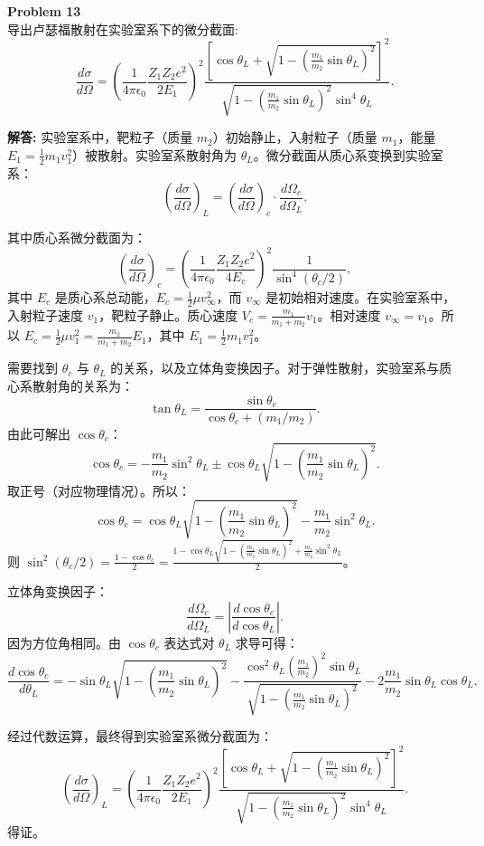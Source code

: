 \documentclass[12pt, a4paper, oneside]{ctexart}
\newenvironment{solution}{\par\noindent\textbf{解答:}\quad}{\par}
\begin{document}
\begin{mdframed}[backgroundcolor=gray!10, linewidth=0pt]
    \textbf{Problem 13} \\
    导出卢瑟福散射在实验室系下的微分截面:
    \[
    \frac{d\sigma}{d\Omega} = \left( \frac{1}{4\pi\epsilon_0} \frac{Z_1 Z_2 e^2}{2 E_1} \right)^2 \frac{\left[ \cos\theta_L + \sqrt{1 - \left( \frac{m_1}{m_2} \sin\theta_L \right)^2 } \right]^2 }{ \sqrt{1 - \left( \frac{m_1}{m_2} \sin\theta_L \right)^2 } \sin^4\theta_L }.
    \]
\end{mdframed}
\begin{solution}
    实验室系中，靶粒子（质量 \(m_2\)）初始静止，入射粒子（质量 \(m_1\)，能量 \(E_1 = \frac{1}{2} m_1 v_1^2\)）被散射。实验室系散射角为 \(\theta_L\)。微分截面从质心系变换到实验室系：
    \[
    \left( \frac{d\sigma}{d\Omega} \right)_L = \left( \frac{d\sigma}{d\Omega} \right)_c \cdot \frac{d\Omega_c}{d\Omega_L}.
    \]
    
    其中质心系微分截面为：
    \[
    \left( \frac{d\sigma}{d\Omega} \right)_c = \left( \frac{1}{4\pi\epsilon_0} \frac{Z_1 Z_2 e^2}{4 E_c} \right)^2 \frac{1}{\sin^4(\theta_c/2)},
    \]
    其中 \(E_c\) 是质心系总动能，\(E_c = \frac{1}{2} \mu v_\infty^2\)，而 \(v_\infty\) 是初始相对速度。在实验室系中，入射粒子速度 \(v_1\)，靶粒子静止。质心速度 \(V_c = \frac{m_1}{m_1+m_2} v_1\)。相对速度 \(v_\infty = v_1\)。所以 \(E_c = \frac{1}{2} \mu v_1^2 = \frac{m_2}{m_1+m_2} E_1\)，其中 \(E_1 = \frac{1}{2} m_1 v_1^2\)。
    
    需要找到 \(\theta_c\) 与 \(\theta_L\) 的关系，以及立体角变换因子。对于弹性散射，实验室系与质心系散射角的关系为：
    \[
    \tan\theta_L = \frac{\sin\theta_c}{\cos\theta_c + (m_1/m_2)}.
    \]
    由此可解出 \(\cos\theta_c\)：
    \[
    \cos\theta_c = -\frac{m_1}{m_2} \sin^2\theta_L \pm \cos\theta_L \sqrt{1 - \left( \frac{m_1}{m_2} \sin\theta_L \right)^2 }.
    \]
    取正号（对应物理情况）。所以：
    \[
    \cos\theta_c = \cos\theta_L \sqrt{1 - \left( \frac{m_1}{m_2} \sin\theta_L \right)^2 } - \frac{m_1}{m_2} \sin^2\theta_L.
    \]
    则 \(\sin^2(\theta_c/2) = \frac{1 - \cos\theta_c}{2} = \frac{1 - \cos\theta_L \sqrt{1 - \left( \frac{m_1}{m_2} \sin\theta_L \right)^2 } + \frac{m_1}{m_2} \sin^2\theta_L}{2}\)。
    
    立体角变换因子：
    \[
    \frac{d\Omega_c}{d\Omega_L} = \left| \frac{d\cos\theta_c}{d\cos\theta_L} \right|.
    \]
    因为方位角相同。由 \(\cos\theta_c\) 表达式对 \(\theta_L\) 求导可得：
    \[
    \frac{d\cos\theta_c}{d\theta_L} = -\sin\theta_L \sqrt{1 - \left( \frac{m_1}{m_2} \sin\theta_L \right)^2 } - \frac{\cos^2\theta_L \left( \frac{m_1}{m_2} \right)^2 \sin\theta_L}{\sqrt{1 - \left( \frac{m_1}{m_2} \sin\theta_L \right)^2 }} - 2\frac{m_1}{m_2} \sin\theta_L \cos\theta_L.
    \]
    
    经过代数运算，最终得到实验室系微分截面为：
    \[
    \left( \frac{d\sigma}{d\Omega} \right)_L = \left( \frac{1}{4\pi\epsilon_0} \frac{Z_1 Z_2 e^2}{2 E_1} \right)^2 \frac{ \left[ \cos\theta_L + \sqrt{1 - \left( \frac{m_1}{m_2} \sin\theta_L \right)^2 } \right]^2 }{ \sqrt{1 - \left( \frac{m_1}{m_2} \sin\theta_L \right)^2 } \sin^4\theta_L }.
    \]
    得证。
\end{solution}
\end{document}

